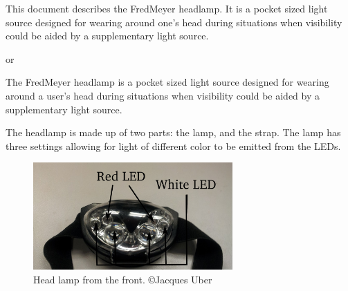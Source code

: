 \documentclass[12pt]{article}
\begin{document}

This document describes the FredMeyer headlamp. It is a pocket sized light source designed for
wearing around one's head during situations when visibility could be aided by a supplementary light
source.

or

The FredMeyer headlamp is a pocket sized light source designed for wearing around a user's head during
situations when visibility could be aided by a supplementary light source.

The headlamp is made up of two parts: the lamp, and the strap. The lamp has three settings
allowing for light of different color to be emitted from the LEDs.


\begin{figure}[h!]
\centering
\caption{Head lamp from the front. \copyright Jacques Uber}
\label{fig:DERP}
\includegraphics[width=3in]{headlamp}
\end{figure}
\end{document}
